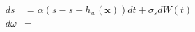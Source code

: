 \begin{align}
    ds &= \alpha(s-\bar{s}+h_w(\mathbf x)) dt + \sigma_s dW(t) \\
    d\omega &= \
\end{align}